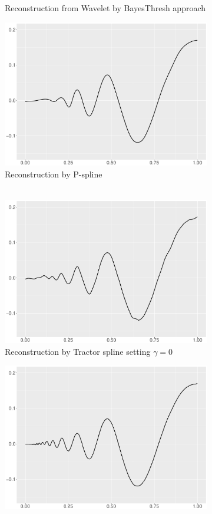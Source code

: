 \begin{figure}
\begin{subfigure}{0.45\textwidth}
    \caption{Reconstruction from Wavelet by BayesThresh approach}
    \end{subfigure}
    \begin{subfigure}{0.45\textwidth}
    \centering
    \includegraphics[width=\linewidth,height=0.45\textwidth]{Chapters/02TractorSplineTheory/plot/ggplot/ggDopplerPSpline.pdf}
    \caption{Reconstruction by P-spline \\\mbox{  } }
    \end{subfigure}
    \begin{subfigure}{0.45\textwidth}
    \centering
    \includegraphics[width=\linewidth,height=0.45\textwidth]{Chapters/02TractorSplineTheory/plot/ggplot/ggDopplerGamma.pdf}
    \caption{Reconstruction by Tractor spline setting $\gamma=0$}
    \end{subfigure}
  \begin{subfigure}{0.45\textwidth}
    \centering
    \includegraphics[width=\linewidth,height=0.45\textwidth]{Chapters/02TractorSplineTheory/plot/ggplot/ggDopplerTractorAPT.pdf}

\end{subfigure}
\end{figure}
